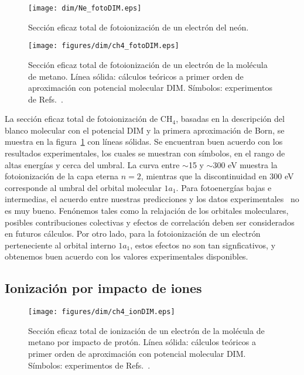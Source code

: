 \begin{figure}
\centering
 \texttt{[image: dim/Ne\_fotoDIM.eps]}
\caption[Fotoionización de neón.]
{Sección eficaz total de fotoionización de un electrón del neón.}
\label{fig:NephotoDIM}
\vspace{0.5cm}
 \texttt{[image: figures/dim/ch4\_fotoDIM.eps]}
\caption[Fotoionización de metano.]
{Sección eficaz total de fotoionización de un electrón de la
molécula de metano. Línea sólida: cálculos teóricos a primer orden de 
aproximación con potencial molecular DIM. Símbolos: experimentos de 
Refs.~\cite{Lukirskii:64,Henke:82,Samson:89}.}
\label{fig:photoch4}
\end{figure}

La sección eficaz total de fotoionización de CH$_4$, basadas en la 
descripción del blanco molecular con el potencial DIM y la primera 
aproximación de Born, se muestra en la figura~\ref{fig:photoch4} con 
líneas sólidas. Se encuentran buen acuerdo con los resultados 
experimentales, los cuales se muestran con símbolos, en el rango de
altas energías y cerca del umbral. La curva entre $\sim$15 y 
$\sim$300 eV muestra la fotoionización de la capa eterna $n=2$, mientras
que la discontinuidad en 300 eV corresponde al umbral del orbital 
molecular $1a_1$. Para fotoenergías bajas e intermedias, el acuerdo entre 
nuestras predicciones y los datos 
experimentales~\cite{Lukirskii:64,Henke:82,Samson:89} no es muy bueno.
Fenónemos tales como la relajación de los orbitales moleculares, posibles
contribuciones colectivas y efectos de correlación deben ser considerados 
en futuros cálculos. Por otro lado, para la fotoionización de un electrón
perteneciente al orbital interno $1a_1$, estos efectos no son tan 
signficativos, y obtenemos buen acuerdo con los valores experimentales
disponibles.

\subsection{Ionización por impacto de iones}
\label{subsec:dimion}

\begin{figure}
\centering
 \texttt{[image: figures/dim/ch4\_ionDIM.eps]}
\caption[Ionización de metano por impacto de protón.]
{Sección eficaz total de ionización de un electrón de la
molécula de metano por impacto de protón. Línea sólida: cálculos 
teóricos a primer orden de aproximación con potencial molecular DIM. 
Símbolos: experimentos de Refs.~\cite{Rudd:83,Rudd:85}.}
\label{fig:ionch4}
\end{figure}

